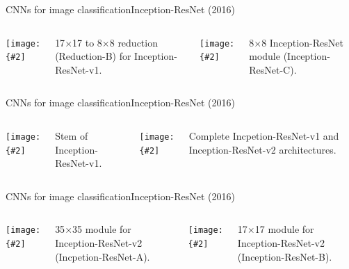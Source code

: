 \documentclass[aspectratio=169]{beamer}
\newcommand{\myfig}[3]{\centerline{\texttt{[image: \{\#2]}}}
\begin{document}
\begin{frame}{CNNs for image classification}{Inception-ResNet (2016)}

  \begin{columns}

    \column{2in}
    
    \myfig{2in}{szegedy-16-fig12}{Szegedy et at.\ (2017), Fig.\ 12}

    \medskip

    17$\times$17 to 8$\times$8 reduction (Reduction-B) for
    Inception-ResNet-v1.

    \column{2in}
    
    \myfig{1.6in}{szegedy-16-fig13}{Szegedy et at.\ (2017), Fig.\ 13}

    \medskip
    
    8$\times$8 Inception-ResNet module (Inception-ResNet-C).
    
  \end{columns}
  
\end{frame}


\begin{frame}{CNNs for image classification}{Inception-ResNet (2016)}

  \begin{columns}

    \column{1.3in}
    
    \myfig{0.9in}{szegedy-16-fig14}{Szegedy et at.\ (2017), Fig.\ 14}

    \column{0.9in}
    
    Stem of Inception-ResNet-v1.

    \column{1.2in}
    
    \myfig{1.0in}{szegedy-16-fig15}{Szegedy et at.\ (2017), Fig.\ 15}

    \column{0.9in}
    
    Complete Incpetion-ResNet-v1 and Inception-ResNet-v2 architectures.
    
  \end{columns}
  
\end{frame}


\begin{frame}{CNNs for image classification}{Inception-ResNet (2016)}

  \begin{columns}

    \column{2in}
    
    \myfig{1.8in}{szegedy-16-fig16}{Szegedy et at.\ (2017), Fig.\ 16}

    \medskip

    35$\times$35 module for
    Inception-ResNet-v2 (Incpetion-ResNet-A).

    \column{2in}
    
    \myfig{1.5in}{szegedy-16-fig17}{Szegedy et at.\ (2017), Fig.\ 17}

    \medskip
    
    17$\times$17 module for Inception-ResNet-v2 (Inception-ResNet-B).
    
  \end{columns}
  
\end{frame}
\end{document}
